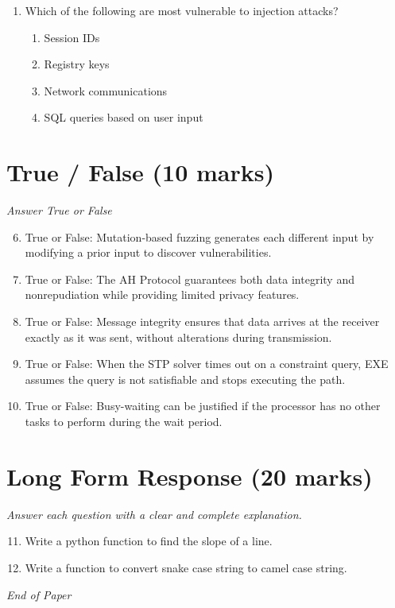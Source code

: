 \documentclass[12pt]{article}
\begin{document}
\begin{enumerate}[label=\arabic*.]
\begin{enumerate}[label=(\alph*)]
    \item The return address
    \item Stack pointer for the calling activation record
\end{enumerate}
\item Which of the following are most vulnerable to injection attacks?
\begin{enumerate}[label=(\alph*)]
    \item Session IDs
    \item Registry keys
    \item Network communications
    \item SQL queries based on user input
\end{enumerate}
\end{enumerate}

\section*{True / False (10 marks)}
\textit{Answer True or False}
\begin{enumerate}[label=\arabic*.]
\setcounter{enumi}{5}
\item True or False: Mutation-based fuzzing generates each different input by modifying a prior input to discover vulnerabilities.
\item True or False: The AH Protocol guarantees both data integrity and nonrepudiation while providing limited privacy features.
\item True or False: Message integrity ensures that data arrives at the receiver exactly as it was sent, without alterations during transmission.
\item True or False: When the STP solver times out on a constraint query, EXE assumes the query is not satisfiable and stops executing the path.
\item True or False: Busy-waiting can be justified if the processor has no other tasks to perform during the wait period.
\end{enumerate}

\section*{Long Form Response (20 marks)}
\textit{Answer each question with a clear and complete explanation.}
\begin{enumerate}[label=\arabic*.]
\setcounter{enumi}{10}
\item Write a python function to find the slope of a line.
\item Write a function to convert snake case string to camel case string.
\end{enumerate}

\vfill
\noindent\textit{End of Paper}
\end{document}
